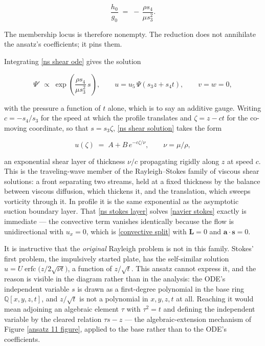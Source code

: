 \documentclass{article}
\theoremstyle{definition}
\theoremstyle{plain}
\begin{document}
\begin{nsexample}
\begin{equation*}
\frac{h_0}{g_0} \;=\; -\,\frac{\rho s_4}{\mu s_3^2} .
\end{equation*}

The membership locus is therefore nonempty.  The reduction does not annihilate
the ansatz's coefficients; it pins them.

Integrating \eqref{ns shear ode} gives the solution

\begin{equation}
\label{ns shear solution}
\Psi' \;\propto\; \exp\!\left(\frac{\rho s_4}{\mu s_3^2}\,s\right),
\qquad u = u_5\,\Psi(s_3 z + s_4 t), \qquad v = w = 0 ,
\end{equation}

\noindent
with the pressure a function of $t$ alone, which is to say an additive gauge.
Writing $c = -s_4/s_3$ for the speed at which the profile translates and
$\zeta = z - ct$ for the co-moving coordinate, so that $s = s_3 \zeta$,
\eqref{ns shear solution} takes the form

\begin{equation}
\label{ns stokes layer}
u(\zeta) \;=\; A + B\,e^{-c\zeta/\nu} , \qquad \nu = \mu/\rho ,
\end{equation}

\noindent
an exponential shear layer of thickness $\nu/c$ propagating rigidly along $z$
at speed $c$.  This is the traveling-wave member of the Rayleigh--Stokes family
of viscous shear solutions: a front separating two streams, held at a fixed
thickness by the balance between viscous diffusion, which thickens it, and the
translation, which sweeps vorticity through it.  In profile it is the same
exponential as the asymptotic suction boundary layer.  That
\eqref{ns stokes layer} solves \eqref{navier stokes} exactly is immediate --- the
convective term vanishes identically because the flow is unidirectional with
$u_x = 0$, which is \eqref{convective split} with $\mathbf{L} = 0$ and
$\mathbf{a}\cdot\mathbf{s} = 0$.

It is instructive that the {\it original} Rayleigh problem is not in this
family.  Stokes' first problem, the impulsively started plate, has the
self-similar solution $u = U\operatorname{erfc}\bigl(z/2\sqrt{\nu t}\bigr)$, a
function of $z/\sqrt{t}$.  This ansatz cannot express it, and the reason is
visible in the diagram rather than in the analysis: the ODE's independent
variable $s$ is drawn as a first-degree polynomial in the base ring
$\mathbb{Q}[x,y,z,t]$, and $z/\sqrt{t}$ is not a polynomial in $x,y,z,t$ at all.
Reaching it would mean adjoining an algebraic element $\tau$ with
$\tau^2 = t$ and defining the independent variable by the cleared relation
$\tau s - z$ --- the algebraic-extension mechanism of Figure
\ref{ansatz 11 figure}, applied to the base rather than to the ODE's
coefficients.


\end{nsexample}
\end{document}
